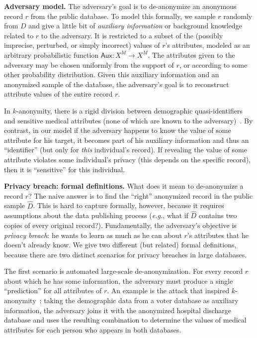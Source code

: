 \documentclass[11pt]{article}
\newcommand{\eg}{\emph{e.g.}}
\newcommand{\Aux}{\textsf{Aux}}
\begin{document}
\vspace{1ex}
\noindent
\textbf{Adversary model.}
The adversary's goal is to de-anonymize an anonymous record $r$ from the
public database.  To model this formally, we sample $r$ randomly from
$D$ and give a little bit of \emph{auxiliary information} or background
knowledge related to $r$ to the adversary.  It is restricted to a subset
of the (possibly imprecise, perturbed, or simply incorrect) values of
$r$'s attributes, modeled as an arbitrary probabilistic function $\Aux
\colon X^M \rightarrow X^M$.  The attributes given to the adversary
may be chosen uniformly from the support of $r$, or according to some
other probability distribution.  Given this auxiliary information and an
anonymized sample of the database, the adversary's goal is to reconstruct
attribute values of the entire record $r$.


In $k$-anonymity, there is a rigid division between demographic
quasi-identifiers and sensitive medical attributes (none of which are
known to the adversary)~\cite{ksweeney}.  By contrast, in our model if
the adversary happens to know the value of some attribute for his target,
it becomes part of his auxiliary information and thus an ``identifier''
(but only for \emph{this} individual's record).  If revealing the value
of some attribute violates some individual's privacy (this depends on
the specific record), then it is ``sensitive'' for this individual.


\vspace{1ex}
\noindent
\textbf{Privacy breach: formal definitions.}
\label{sec:breach}
What does it mean to de-anonymize a record $r$?  The naive answer is
to find the ``right'' anonymized record in the public sample ${\hat
D}$.  This is hard to capture formally, however, because it requires
assumptions about the data publishing process (\eg, what if ${\hat
D}$ contains two copies of every original record?).  Fundamentally,
the adversary's objective is \emph{privacy breach}: he wants to learn
as much as he can about $r$'s attributes that he doesn't already know.
We give two different (but related) formal definitions, because there
are two distinct scenarios for privacy breaches in large databases.

The first scenario is automated large-scale de-anonymization.  For every
record $r$ about which he has some information, the adversary must
produce a single ``prediction'' for all attributes of $r$.  An example
is the attack that inspired $k$-anonymity~\cite{sweeney}: taking the
demographic data from a voter database as auxiliary information, the
adversary joins it with the anonymized hospital discharge database
and uses the resulting combination to determine the values of medical
attributes for each person who appears in both databases.
\end{document}
